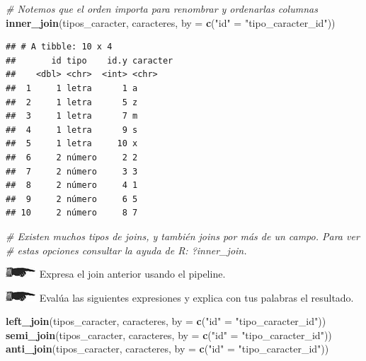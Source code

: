 \documentclass[]{book}
\newenvironment{Shaded}{\begin{snugshade}}{\end{snugshade}}
\newcommand{\KeywordTok}[1]{\textcolor[rgb]{0.13,0.29,0.53}{\textbf{#1}}}
\newcommand{\DataTypeTok}[1]{\textcolor[rgb]{0.13,0.29,0.53}{#1}}
\newcommand{\StringTok}[1]{\textcolor[rgb]{0.31,0.60,0.02}{#1}}
\newcommand{\CommentTok}[1]{\textcolor[rgb]{0.56,0.35,0.01}{\textit{#1}}}
\newcommand{\NormalTok}[1]{#1}
\theoremstyle{definition}
\theoremstyle{definition}
\theoremstyle{definition}
\theoremstyle{remark}
\begin{document}
\begin{Shaded}
\begin{Highlighting}[]
\CommentTok{# Notemos que el orden importa para renombrar y ordenarlas columnas}
\KeywordTok{inner_join}\NormalTok{(tipos_caracter, caracteres, }\DataTypeTok{by =} \KeywordTok{c}\NormalTok{(}\StringTok{"id"}\NormalTok{ =}\StringTok{ "tipo_caracter_id"}\NormalTok{))}
\end{Highlighting}
\end{Shaded}

\begin{verbatim}
## # A tibble: 10 x 4
##       id tipo    id.y caracter
##    <dbl> <chr>  <int> <chr>   
##  1     1 letra      1 a       
##  2     1 letra      5 z       
##  3     1 letra      7 m       
##  4     1 letra      9 s       
##  5     1 letra     10 x       
##  6     2 número     2 2       
##  7     2 número     3 3       
##  8     2 número     4 1       
##  9     2 número     6 5       
## 10     2 número     8 7
\end{verbatim}

\begin{Shaded}
\begin{Highlighting}[]
\CommentTok{# Existen muchos tipos de joins, y también joins por más de un campo. Para ver}
\CommentTok{# estas opciones consultar la ayuda de R: ?inner_join.}
\end{Highlighting}
\end{Shaded}

\includegraphics{./imagenes/manicule2.jpg} Expresa el join anterior
usando el pipeline.

\includegraphics{./imagenes/manicule2.jpg} Evalúa las siguientes
expresiones y explica con tus palabras el resultado.

\begin{Shaded}
\begin{Highlighting}[]
\KeywordTok{left_join}\NormalTok{(tipos_caracter, caracteres, }\DataTypeTok{by =} \KeywordTok{c}\NormalTok{(}\StringTok{"id"}\NormalTok{ =}\StringTok{ "tipo_caracter_id"}\NormalTok{))}
\KeywordTok{semi_join}\NormalTok{(tipos_caracter, caracteres, }\DataTypeTok{by =} \KeywordTok{c}\NormalTok{(}\StringTok{"id"}\NormalTok{ =}\StringTok{ "tipo_caracter_id"}\NormalTok{))}
\KeywordTok{anti_join}\NormalTok{(tipos_caracter, caracteres, }\DataTypeTok{by =} \KeywordTok{c}\NormalTok{(}\StringTok{"id"}\NormalTok{ =}\StringTok{ "tipo_caracter_id"}\NormalTok{))}
\end{Highlighting}
\end{Shaded}
\end{document}
